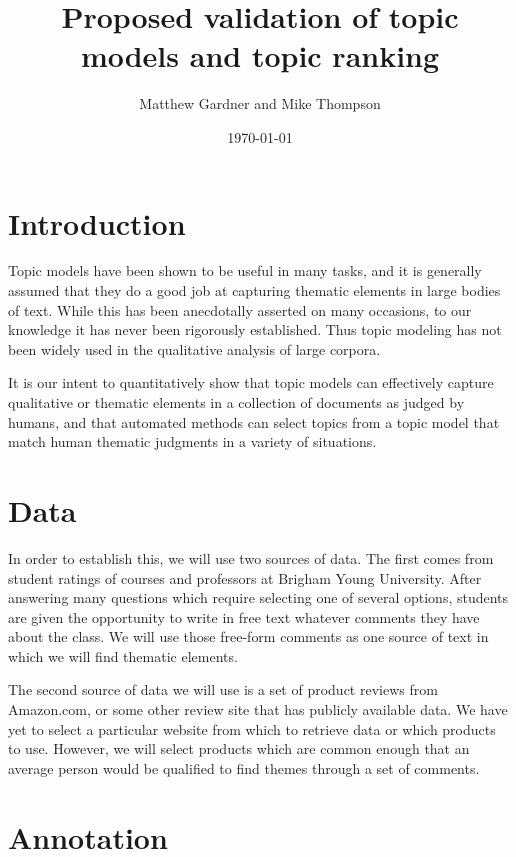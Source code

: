 \documentclass[onecolumn, 11pt]{article}
\title{Proposed validation of topic models and topic ranking}
\author{Matthew Gardner and Mike Thompson}
\date{\today}
\begin{document}
\maketitle

\section{Introduction}

Topic models have been shown to be useful in many tasks, and it is generally
assumed that they do a good job at capturing thematic elements in large bodies
of text.  While this has been anecdotally asserted on many occasions, to our
knowledge it has never been rigorously established.  Thus topic modeling has
not been widely used in the qualitative analysis of large corpora.

It is our intent to quantitatively show that topic models can effectively
capture qualitative or thematic elements in a collection of documents as judged
by humans, and that automated methods can select topics from a topic model that
match human thematic judgments in a variety of situations.

\section{Data}

In order to establish this, we will use two sources of data.  The first comes
from student ratings of courses and professors at Brigham Young University.
After answering many questions which require selecting one of several options,
students are given the opportunity to write in free text whatever comments they
have about the class.  We will use those free-form comments as one source of
text in which we will find thematic elements.

The second source of data we will use is a set of product reviews from
Amazon.com, or some other review site that has publicly available data.  We
have yet to select a particular website from which to retrieve data or which
products to use.  However, we will select products which are common enough that
an average person would be qualified to find themes through a set of comments.

\section{Annotation}
\end{document}
